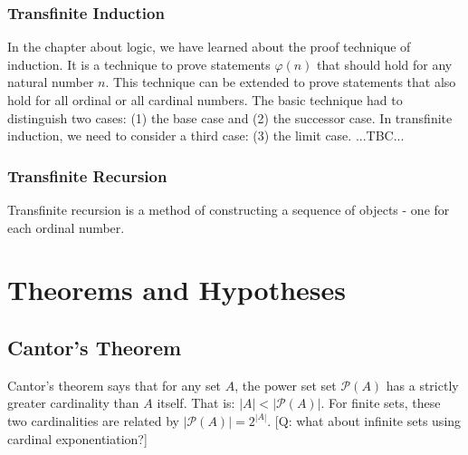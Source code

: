 

\subsubsection{Transfinite Induction}
In the chapter about logic, we have learned about the proof technique of induction. It is a technique to prove statements $\varphi(n)$ that should hold for any natural number $n$. This technique can be extended to prove statements that also hold for all ordinal or all cardinal numbers. The basic technique had to distinguish two cases: (1) the base case and (2) the successor case. In transfinite induction, we need to consider a third case: (3) the limit case. ...TBC...



\subsubsection{Transfinite Recursion}
Transfinite recursion is a method of constructing a sequence of objects - one for each ordinal number.





\section{Theorems and Hypotheses}

\subsection{Cantor's Theorem}
Cantor's theorem says that for any set $A$, the power set set $\mathcal{P}(A)$ has a strictly greater cardinality than $A$ itself. That is: $|A| < |\mathcal{P}(A)|$. For finite sets, these two cardinalities are related by $|\mathcal{P}(A)| = 2^{|A|}$. [Q: what about infinite sets using cardinal exponentiation?]

